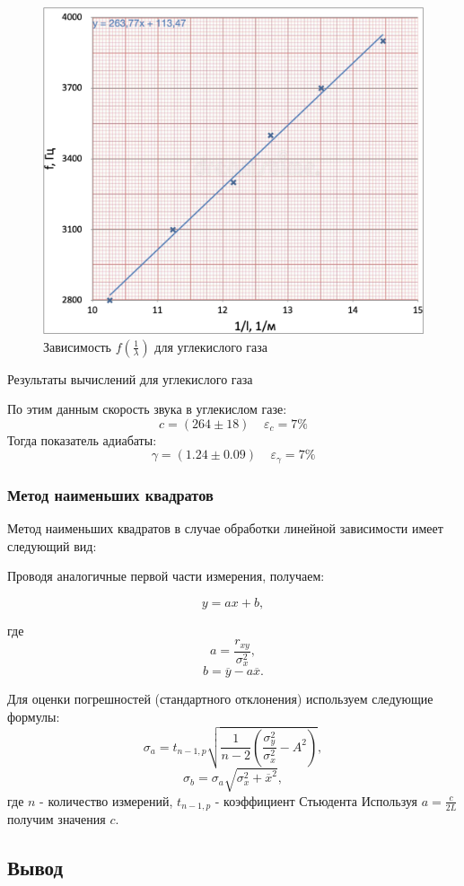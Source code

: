 \documentclass[12pt,a4paper]{article}
\begin{document}
\begin{figure}[H]
	\includegraphics[width = 10.5 cm]{src/f(1_l)co2.pdf}
	\caption{Зависимость $f(\frac{1}{\lambda})$ для углекислого газа}
	\label{fig:flc}
\end{figure}

\begin{table}[H]
	\caption{Результаты вычислений для углекислого газа}
	
\end{table}
По этим данным скорость звука в углекислом газе:
    $$c=(264 \pm 18) \;\;\;\; \varepsilon_{c}=7\%$$
Тогда показатель адиабаты:
    $$\gamma=(1.24 \pm 0.09) \;\;\;\; \varepsilon_{\gamma}=7\%$$

\subsubsection*{Метод наименьших квадратов}
Метод наименьших квадратов в случае обработки линейной зависимости имеет следующий вид:

Проводя аналогичные первой части измерения, получаем:

$$y = ax + b,$$

где $$a = \frac{r_{xy}}{ \sigma_x^2},$$
$$b = \overline{y} - a\overline{x}.$$

Для оценки погрешностей (стандартного отклонения) используем следующие формулы:
$$\sigma_a =  t_{n-1, p} \sqrt{\frac{1}{n-2} \left( \frac{\sigma_y^2}{\sigma_x^2} - A^2 \right)},$$
$$\sigma_b = \sigma_a \sqrt{\sigma_x^2 + \overline{x}^2},$$
где 
$n$ - количество измерений, $ t_{n-1, p}$ - коэффициент Стьюдента
Используя $a = \frac{c}{2L}$ получим значения $c$.


\subsection*{Вывод}
\end{document}
